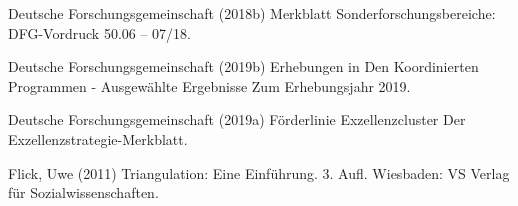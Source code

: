 \documentclass[a4paper,10pt,twoside]{article}
\begin{document}
\begin{CSLReferences}{0}{0}
\leavevmode\hypertarget{ref-deutscheforschungsgemeinschaftMerkblattSonderforschungsbereicheDFGVordruck2018}{}%
Deutsche Forschungsgemeinschaft (2018b) Merkblatt {Sonderforschungsbereiche}: {DFG}-{Vordruck} 50.06 -- 07/18.

\leavevmode\hypertarget{ref-deutscheforschungsgemeinschaftErhebungenKoordiniertenProgrammen2019}{}%
Deutsche Forschungsgemeinschaft (2019b) Erhebungen in Den Koordinierten {Programmen} - {Ausgewählte Ergebnisse} Zum {Erhebungsjahr} 2019.

\leavevmode\hypertarget{ref-deutscheforschungsgemeinschaftForderlinieExzellenzclusterExzellenzstrategieMerkblatt2019}{}%
Deutsche Forschungsgemeinschaft (2019a) Förderlinie {Exzellenzcluster} Der {Exzellenzstrategie}-{Merkblatt}.

\leavevmode\hypertarget{ref-flickTriangulationEinfuehrung2011}{}%
Flick, Uwe (2011) Triangulation: Eine Einführung. 3. Aufl. {Wiesbaden}: {VS Verlag für Sozialwissenschaften}.

\end{CSLReferences}
\end{document}
